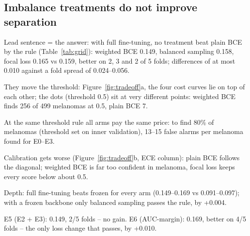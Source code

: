 \subsection{Imbalance treatments do not improve separation}
\begin{notes}
  \item Lead sentence = the answer: with full fine-tuning, no treatment beat plain BCE by the rule (Table~\ref{tab:grid}): weighted BCE 0.149, balanced sampling 0.158, focal loss 0.165 vs 0.159, better on 2, 3 and 2 of 5 folds; differences of at most 0.010 against a fold spread of 0.024--0.056.
  \item They move the threshold: Figure~\ref{fig:tradeoff}a, the four cost curves lie on top of each other; the dots (threshold 0.5) sit at very different points: weighted BCE finds 256 of 499 melanomas at 0.5, plain BCE 7.
  \item At the same threshold rule all arms pay the same price: to find 80\% of melanomas (threshold set on inner validation), 13--15 false alarms per melanoma found for E0--E3.
  \item Calibration gets worse (Figure~\ref{fig:tradeoff}b, ECE column): plain BCE follows the diagonal; weighted BCE is far too confident in melanoma, focal loss keeps every score below about 0.5.
  \item Depth: full fine-tuning beats frozen for every arm (0.149--0.169 vs 0.091--0.097); with a frozen backbone only balanced sampling passes the rule, by +0.004.
  \item E5 (E2 + E3): 0.149, 2/5 folds -- no gain. E6 (AUC-margin): 0.169, better on 4/5 folds -- the only loss change that passes, by +0.010.
\end{notes}

